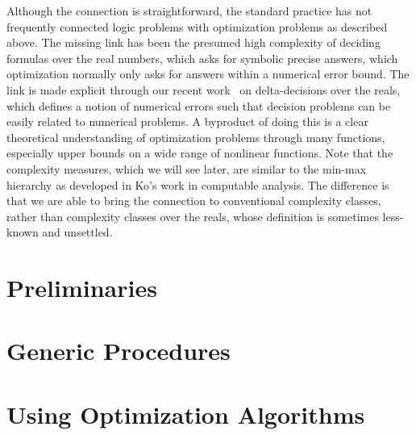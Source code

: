 \documentclass{llncs}
\begin{document}
Although the connection is straightforward, the standard practice has not frequently connected logic problems with optimization problems as described above. The missing link has been the presumed high complexity of deciding formulas over the real numbers, which asks for symbolic precise answers, which optimization normally only asks for answers within a numerical error bound. The link is made explicit through our recent work~\cite{} on delta-decisions over the reals, which defines a notion of numerical errors such that decision problems can be easily related to numerical problems. A byproduct of doing this is a clear theoretical understanding of optimization problems through many functions, especially upper bounds on a wide range of nonlinear functions. Note that the complexity measures, which we will see later, are similar to the min-max hierarchy as developed in Ko's work in computable analysis. The difference is that we are able to bring the connection to conventional complexity classes, rather than complexity classes over the reals, whose definition is sometimes less-known and unsettled. 





\section{Preliminaries}

\section{Generic Procedures}

\section{Using Optimization Algorithms}
\end{document}
